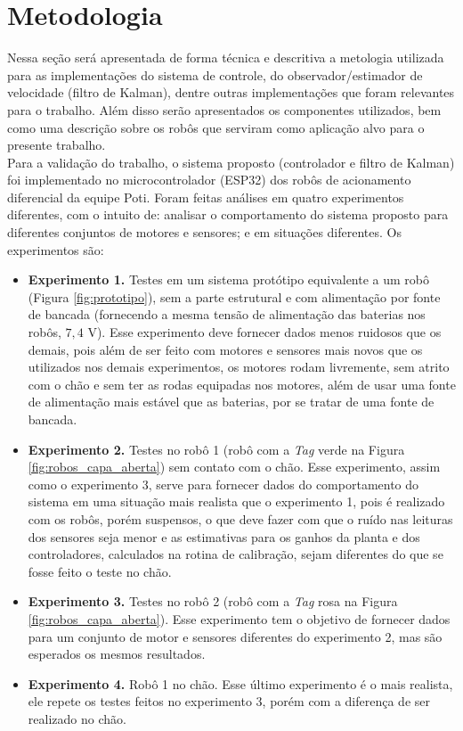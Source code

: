 \chapter[Metodologia]{Metodologia}
\label{ch:metodologia}

Nessa seção será apresentada de forma técnica e descritiva a metologia utilizada para as implementações do sistema de controle, do observador/estimador de velocidade (filtro de Kalman), dentre outras implementações que foram relevantes para o trabalho. Além disso serão apresentados os componentes utilizados, bem como uma descrição sobre os robôs que serviram como aplicação alvo para o presente trabalho.\\

Para a validação do trabalho, o sistema proposto (controlador e filtro de Kalman) foi implementado no microcontrolador (ESP32) dos robôs de acionamento diferencial da equipe Poti. Foram feitas análises em quatro experimentos diferentes, com o intuito de: analisar o comportamento do sistema proposto para diferentes conjuntos de motores e sensores; e em situações diferentes. Os experimentos são:

\begin{itemize}
    \item \textbf{Experimento 1.} Testes em um sistema protótipo equivalente a um robô (Figura \ref{fig:prototipo}), sem a parte estrutural e com alimentação por fonte de bancada (fornecendo a mesma tensão de alimentação das baterias nos robôs, $7,4$ V). Esse experimento deve fornecer dados menos ruidosos que os demais, pois além de ser feito com motores e sensores mais novos que os utilizados nos demais experimentos, os motores rodam livremente, sem atrito com o chão e sem ter as rodas equipadas nos motores, além de usar uma fonte de alimentação mais estável que as baterias, por se tratar de uma fonte de bancada.
    \item \textbf{Experimento 2.} Testes no robô 1 (robô com a \emph{Tag} verde na Figura \ref{fig:robos_capa_aberta}) sem contato com o chão. Esse experimento, assim como o experimento 3, serve para fornecer dados do comportamento do sistema em uma situação mais realista que o experimento 1, pois é realizado com os robôs, porém suspensos, o que deve fazer com que o ruído nas leituras dos sensores seja menor e as estimativas para os ganhos da planta e dos controladores, calculados na rotina de calibração, sejam diferentes do que se fosse feito o teste no chão.
    \item \textbf{Experimento 3.} Testes no robô 2 (robô com a \emph{Tag} rosa na Figura \ref{fig:robos_capa_aberta}). Esse experimento tem o objetivo de fornecer dados para um conjunto de motor e sensores diferentes do experimento 2, mas são esperados os mesmos resultados.
    \item \textbf{Experimento 4.} Robô 1 no chão. Esse último experimento é o mais realista, ele repete os testes feitos no experimento 3, porém com a diferença de ser realizado no chão.
\end{itemize}

